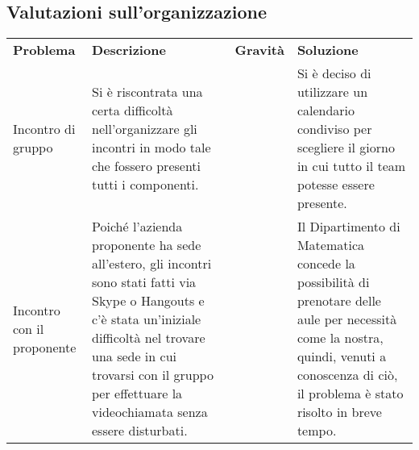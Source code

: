 \subsection{Valutazioni sull'organizzazione}
\begin{table}[H]
	\renewcommand{\arraystretch}{1.5}
	\caption{Tabella delle problematiche relative all'organizzazione}
	\begin{longtable}{ >{\centering}p{} >{}p{}
			>{\centering}p{} >{}p{}}
			
		\rowcolorhead
		\textbf{\color{white}Problema} 
		& \textbf{\color{white}Descrizione} 
		& \centering\textbf{\color{white}Gravità}
		& \textbf{\color{white}Soluzione} 
		\tabularnewline %
		
		Incontro di gruppo &
		Si è riscontrata una certa difficoltà nell'organizzare gli incontri in modo
		tale che fossero presenti tutti i componenti. &
		2 &
		Si è deciso di utilizzare un calendario condiviso per scegliere il giorno
		in cui tutto il team potesse essere presente. 
				
		\tabularnewline 
		Incontro con il proponente &
		Poiché l'azienda proponente ha sede all'estero, gli incontri sono stati fatti 
		via Skype o Hangouts e c'è stata un'iniziale difficoltà nel trovare una sede in cui 
		trovarsi con il gruppo per effettuare la videochiamata senza essere disturbati. &
		1 &
		Il Dipartimento di Matematica concede la possibilità di prenotare delle aule
		per necessità come la nostra, quindi, venuti a conoscenza di ciò, il problema 
		è stato risolto in breve tempo.
			
	\end{longtable}
		
\end{table}

